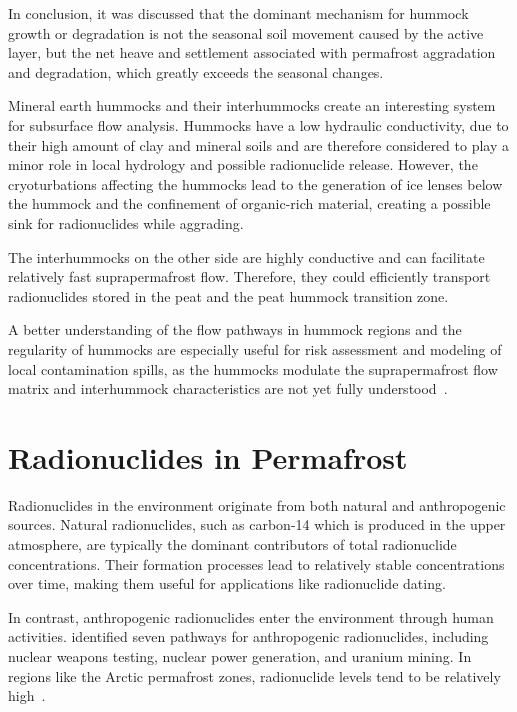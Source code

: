 In conclusion, it was discussed that the dominant mechanism for hummock growth or degradation is not the seasonal soil movement caused by the active layer, but the net heave and settlement associated with permafrost aggradation and degradation, which greatly exceeds the seasonal changes.

Mineral earth hummocks and their interhummocks create an interesting system for subsurface flow analysis. 
Hummocks have a low hydraulic conductivity, due to their high amount of clay and mineral soils and are therefore considered to play a minor role in local hydrology and possible radionuclide release. 
However, the cryoturbations affecting the hummocks lead to the generation of ice lenses below the hummock and the confinement of organic-rich material, creating a possible sink for radionuclides while aggrading.

The interhummocks on the other side are highly conductive and can facilitate relatively fast suprapermafrost flow. 
Therefore, they could efficiently transport radionuclides stored in the peat and the peat hummock transition zone.

A better understanding of the flow pathways in hummock regions and the regularity of hummocks are especially useful for risk assessment and modeling of local contamination spills, as the hummocks modulate the suprapermafrost flow matrix and interhummock characteristics are not yet fully understood~\citep{dakinHowDryYear2023,quintonSubsurfaceDrainageHummockcovered2000}.

\section{Radionuclides in Permafrost}
Radionuclides in the environment originate from both natural and anthropogenic sources. 
Natural radionuclides, such as carbon-14 which is produced in the upper atmosphere, are typically the dominant contributors of total radionuclide concentrations. 
Their formation processes lead to relatively stable concentrations over time, making them useful for applications like radionuclide dating.

In contrast, anthropogenic radionuclides enter the environment through human activities. 
\citet{huSourcesAnthropogenicRadionuclides2010} identified seven pathways for anthropogenic radionuclides, including nuclear weapons testing, nuclear power generation, and uranium mining. 
In regions like the Arctic permafrost zones, radionuclide levels tend to be relatively high~\citep{bondPermafrostThawImplications2018}.

